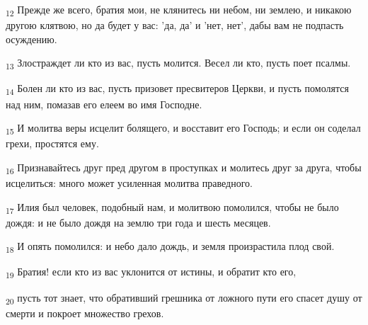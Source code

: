 \begin{tcolorbox}
\textsubscript{12} Прежде же всего, братия мои, не клянитесь ни небом, ни землею, и никакою другою клятвою, но да будет у вас: 'да, да' и 'нет, нет', дабы вам не подпасть осуждению.
\end{tcolorbox}
\begin{tcolorbox}
\textsubscript{13} Злостраждет ли кто из вас, пусть молится. Весел ли кто, пусть поет псалмы.
\end{tcolorbox}
\begin{tcolorbox}
\textsubscript{14} Болен ли кто из вас, пусть призовет пресвитеров Церкви, и пусть помолятся над ним, помазав его елеем во имя Господне.
\end{tcolorbox}
\begin{tcolorbox}
\textsubscript{15} И молитва веры исцелит болящего, и восставит его Господь; и если он соделал грехи, простятся ему.
\end{tcolorbox}
\begin{tcolorbox}
\textsubscript{16} Признавайтесь друг пред другом в проступках и молитесь друг за друга, чтобы исцелиться: много может усиленная молитва праведного.
\end{tcolorbox}
\begin{tcolorbox}
\textsubscript{17} Илия был человек, подобный нам, и молитвою помолился, чтобы не было дождя: и не было дождя на землю три года и шесть месяцев.
\end{tcolorbox}
\begin{tcolorbox}
\textsubscript{18} И опять помолился: и небо дало дождь, и земля произрастила плод свой.
\end{tcolorbox}
\begin{tcolorbox}
\textsubscript{19} Братия! если кто из вас уклонится от истины, и обратит кто его,
\end{tcolorbox}
\begin{tcolorbox}
\textsubscript{20} пусть тот знает, что обративший грешника от ложного пути его спасет душу от смерти и покроет множество грехов.
\end{tcolorbox}
